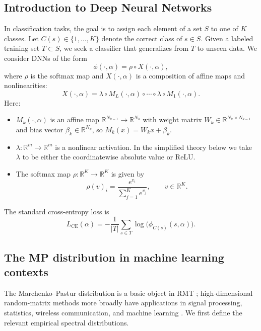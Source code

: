 \documentclass[11pt]{article}
\theoremstyle{plain}
\theoremstyle{definition}
\theoremstyle{remark}
\newcommand{\R}{\mathbb{R}}
\newcommand{\1}{\mathbf{1}}
\begin{document}
\subsection{Introduction to Deep Neural Networks}
\label{introduction_deep_neural_networks}

In classification tasks, the goal is to assign each element of a set \(S\) to one of \(K\) classes. Let \(C(s)\in\{1,\dots,K\}\) denote the correct class of \(s\in S\). Given a labeled training set \(T\subset S\), we seek a classifier that generalizes from \(T\) to unseen data. We consider DNNs of the form
\[
\phi(\cdot,\alpha)=\rho\circ X(\cdot,\alpha),
\]
where \(\rho\) is the softmax map and \(X(\cdot,\alpha)\) is a composition of affine maps and nonlinearities:
\[
X(\cdot,\alpha)=\lambda\circ M_L(\cdot,\alpha)\circ\cdots\circ\lambda\circ M_1(\cdot,\alpha).
\]
Here:
\begin{itemize}[leftmargin=2em]
\item \(M_k(\cdot,\alpha)\) is an affine map \(\R^{N_{k-1}}\to\R^{N_k}\) with weight matrix \(W_k\in\R^{N_k\times N_{k-1}}\) and bias vector \(\beta_k\in\R^{N_k}\), so \(M_k(x)=W_kx+\beta_k\).
\item \(\lambda:\R^m\to\R^m\) is a nonlinear activation. In the simplified theory below we take \(\lambda\) to be either the coordinatewise absolute value or ReLU.
\item The softmax map \(\rho:\R^K\to\R^K\) is given by
\begin{equation}
\label{soft_max_new}
\rho(v)_i=\frac{e^{v_i}}{\sum_{j=1}^{K} e^{v_j}},\qquad v\in\R^K.
\end{equation}
\end{itemize}
The standard cross-entropy loss is
\begin{equation}
\label{CE}
L_{\mathrm{CE}}(\alpha)=-\frac{1}{|T|}\sum_{s\in T}\log\big(\phi_{C(s)}(s,\alpha)\big).
\end{equation}

\subsection{The MP distribution in machine learning contexts}
\label{sec:MP_distribution}

The Marchenko--Pastur distribution is a basic object in RMT \cite{marchenko1967distribution}; high-dimensional random-matrix methods more broadly have applications in signal processing, statistics, wireless communication, and machine learning \cite{vershynin2018high,ge2021large,serdobolskii2000multivariate,couillet2011random}. We first define the relevant empirical spectral distributions.
\end{document}
